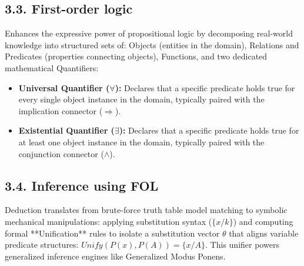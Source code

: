 \documentclass[../main.tex]{subfiles}
\begin{document}
\subsection{3.3. First-order logic}
Enhances the expressive power of propositional logic by decomposing real-world knowledge into structured sets of: Objects (entities in the domain), Relations and Predicates (properties connecting objects), Functions, and two dedicated mathematical Quantifiers:
\begin{itemize}
    \item \textbf{Universal Quantifier ($\forall$):} Declares that a specific predicate holds true for every single object instance in the domain, typically paired with the implication connector ($\Rightarrow$).
    \item \textbf{Existential Quantifier ($\exists$):} Declares that a specific predicate holds true for at least one object instance in the domain, typically paired with the conjunction connector ($\wedge$).
\end{itemize}

\subsection{3.4. Inference using FOL}
Deduction translates from brute-force truth table model matching to symbolic mechanical manipulations: applying substitution syntax ($\{x/k\}$) and computing formal **Unification** rules to isolate a substitution vector $\theta$ that aligns variable predicate structures: $Unify(P(x), P(A)) = \{x/A\}$. This unifier powers generalized inference engines like Generalized Modus Ponens.
\end{document}
